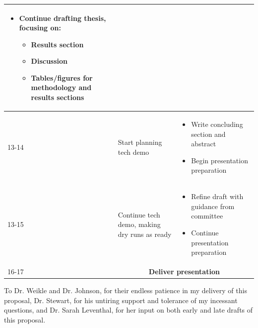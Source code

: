 \documentclass[manuscript,screen,review]{acmart}
\begin{document}
\begin{center}
\begin{tabular}{ |p{1cm}||p{6.5cm}|p{6.5cm}| }
\begin{itemize}[leftmargin=*]
        \item Continue drafting thesis, focusing on: 
        \begin{itemize}
            \item Results section
            \item Discussion
            \item Tables/figures for methodology and results sections
        \end{itemize}
    \end{itemize}
     \\
    \hline
    13-14
    &
    Start planning tech demo
    &
    \begin{itemize}[leftmargin=*]
        \item Write concluding section and abstract
        \item Begin presentation preparation
    \end{itemize} \\
    \hline
    13-15
    &
    Continue tech demo, making dry runs as ready
    &
    \begin{itemize}[leftmargin=*]
        \item Refine draft with guidance from committee
        \item Continue presentation preparation
    \end{itemize} \\
    \hline
    16-17
    &
    \multicolumn{2}{|c|}{
        \textbf{Deliver presentation}
    } \\
    \hline
    \end{tabular}
\end{center}

\begin{acks}
To Dr. Weikle and Dr. Johnson, for their endless patience in my delivery of this proposal, Dr. Stewart, for his untiring support and tolerance of my incessant questions, and Dr. Sarah Leventhal, for her input on both early and late drafts of this proposal.
\end{acks}




\end{document}
